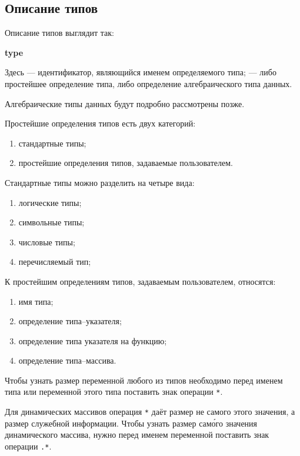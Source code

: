 \documentclass[10pt]{report}
\begin{document}
        \subsection{Описание типов}
Описание типов выглядит так:
\begin{center}
\noindent\textbf{type} \textcolor{Green}{}
\end{center}

Здесь \textcolor{Green}{} --- идентификатор, являющийся именем определяемого типа; \textcolor{Green}{} --- либо
простейшее определение типа, либо определение алгебраического типа данных.

Алгебраические типы данных будут подробно рассмотрены позже. 

Простейшие определения типов есть двух категорий:
\begin{enumerate}
    \item стандартные типы;
    \item простейшие определения типов, задаваемые пользователем.
\end{enumerate}

Стандартные типы можно разделить на четыре вида:
\begin{enumerate}
    \item логические типы;
    \item символьные типы;
    \item числовые типы;
    \item перечисляемый тип;
\end{enumerate}

К простейшим определениям типов, задаваемым пользователем, относятся:
\begin{enumerate}
    \item имя типа;
    \item определение типа--указателя;
    \item определение типа указателя на функцию;
    \item определение типа--массива.
\end{enumerate}

Чтобы узнать размер переменной любого из типов необходимо перед именем типа или переменной этого типа поставить знак операции \texttt{*}.

Для динамических массивов операция \texttt{*} даёт размер не самого этого значения, а размер служебной информации. Чтобы узнать размер сам\'{о}го
значения динамического массива, нужно перед именем переменной поставить знак операции \texttt{.*}.
\end{document}
